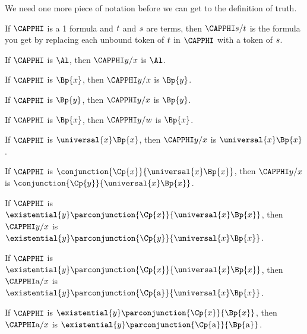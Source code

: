 We need one more piece of notation before we can get to the definition of truth.
\begin{majorILnc}{}
	If $\CAPPHI$ is a \GQL{}1 formula and $t$ and $s$ are terms, then $\CAPPHI\variable{s}/\variable{t}$ is the formula you get by replacing each unbound token of $t$ in $\CAPPHI$ with a token of $s$.
\end{majorILnc}

\begin{majorILnc}{}
	\begin{cenumerate}
		\item If $\CAPPHI$ is $\Al$, then $\CAPPHI\variable{y}/\variable{x}$ is $\Al$.
		\item If $\CAPPHI$ is $\Bp{\variable{x}}$, then $\CAPPHI\variable{y}/\variable{x}$ is $\Bp{\variable{y}}$.
		\item If $\CAPPHI$ is $\Bp{\variable{y}}$, then $\CAPPHI\variable{y}/\variable{x}$ is $\Bp{\variable{y}}$.
		\item If $\CAPPHI$ is $\Bp{\variable{x}}$, then $\CAPPHI\variable{y}/\variable{w}$ is $\Bp{\variable{x}}$.
		\item If $\CAPPHI$ is $\universal{x}\Bp{\variable{x}}$, then $\CAPPHI\variable{y}/\variable{x}$ is $\universal{x}\Bp{\variable{x}}$.
		\item If $\CAPPHI$ is $\conjunction{\Cp{\variable{x}}}{\universal{x}\Bp{\variable{x}}}$, then $\CAPPHI\variable{y}/\variable{x}$ is $\conjunction{\Cp{\variable{y}}}{\universal{x}\Bp{\variable{x}}}$.
		\item If $\CAPPHI$ is $\existential{\variable{y}}\parconjunction{\Cp{\variable{x}}}{\universal{x}\Bp{\variable{x}}}$, then $\CAPPHI\variable{y}/\variable{x}$ is $\existential{\variable{y}}\parconjunction{\Cp{\variable{y}}}{\universal{x}\Bp{\variable{x}}}$.
		\item If $\CAPPHI$ is $\existential{\variable{y}}\parconjunction{\Cp{\variable{x}}}{\universal{x}\Bp{\variable{x}}}$, then $\CAPPHI\constant{a}/\variable{x}$ is $\existential{\variable{y}}\parconjunction{\Cp{\constant{a}}}{\universal{x}\Bp{\variable{x}}}$.
		\item If $\CAPPHI$ is $\existential{\variable{y}}\parconjunction{\Cp{\variable{x}}}{\Bp{\variable{x}}}$, then $\CAPPHI\constant{a}/\variable{x}$ is $\existential{\variable{y}}\parconjunction{\Cp{\constant{a}}}{\Bp{\constant{a}}}$.
	\end{cenumerate}
\end{majorILnc}

